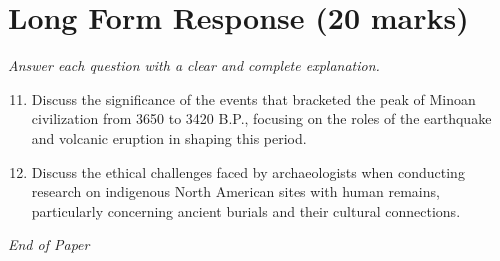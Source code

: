 \documentclass[12pt]{article}
\begin{document}
\section*{Long Form Response (20 marks)}
\textit{Answer each question with a clear and complete explanation.}
\begin{enumerate}[label=\arabic*.]
\setcounter{enumi}{10}
\item Discuss the significance of the events that bracketed the peak of Minoan civilization from
3650 to 3420 B.P., focusing on the roles of the earthquake and volcanic eruption in
shaping this period.
\item Discuss the ethical challenges faced by archaeologists when conducting research on
indigenous North American sites with human remains, particularly concerning ancient
burials and their cultural connections.
\end{enumerate}

\vfill
\noindent\textit{End of Paper}
\end{document}
